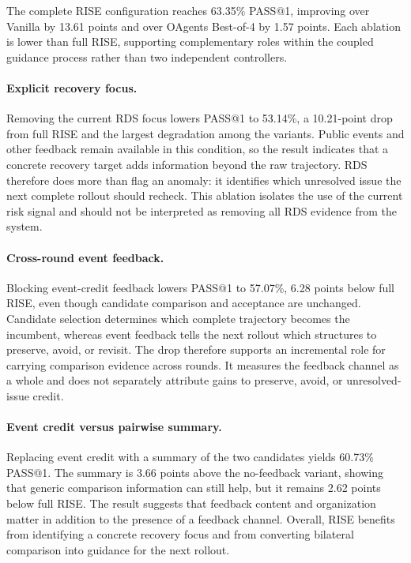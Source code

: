 \documentclass{article}
\begin{document}
The complete RISE configuration reaches 63.35\% PASS@1, improving over Vanilla by 13.61 points and over OAgents Best-of-4 by 1.57 points. Each ablation is lower than full RISE, supporting complementary roles within the coupled guidance process rather than two independent controllers.

\paragraph{Explicit recovery focus.} Removing the current RDS focus lowers PASS@1 to 53.14\%, a 10.21-point drop from full RISE and the largest degradation among the variants. Public events and other feedback remain available in this condition, so the result indicates that a concrete recovery target adds information beyond the raw trajectory. RDS therefore does more than flag an anomaly: it identifies which unresolved issue the next complete rollout should recheck. This ablation isolates the use of the current risk signal and should not be interpreted as removing all RDS evidence from the system.

\paragraph{Cross-round event feedback.} Blocking event-credit feedback lowers PASS@1 to 57.07\%, 6.28 points below full RISE, even though candidate comparison and acceptance are unchanged. Candidate selection determines which complete trajectory becomes the incumbent, whereas event feedback tells the next rollout which structures to preserve, avoid, or revisit. The drop therefore supports an incremental role for carrying comparison evidence across rounds. It measures the feedback channel as a whole and does not separately attribute gains to preserve, avoid, or unresolved-issue credit.

\paragraph{Event credit versus pairwise summary.} Replacing event credit with a summary of the two candidates yields 60.73\% PASS@1. The summary is 3.66 points above the no-feedback variant, showing that generic comparison information can still help, but it remains 2.62 points below full RISE. The result suggests that feedback content and organization matter in addition to the presence of a feedback channel. Overall, RISE benefits from identifying a concrete recovery focus and from converting bilateral comparison into guidance for the next rollout.
\end{document}
